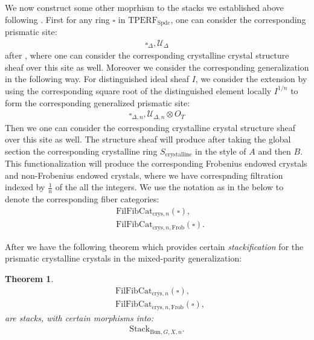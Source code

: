 \documentclass[12pt]{article}
\newtheorem{theorem}{Theorem}
\theoremstyle{definition}
\begin{document}
\noindent We now construct some other moprhism to the stacks we established above following \cite{FS}. First for any ring $\square$ in $\mathrm{TPERF}_{\mathrm{Spd}e}$, one can consider the corresponding prismatic site:
\begin{align}
\square_\Delta,\mathcal{U}_{\Delta}
\end{align} 
after \cite{BS2}, where one can consider the corresponding crystalline crystal structure sheaf over this site as well. Moreover we consider the corresponding generalization in the following way. For distinguished ideal sheaf $I$, we consider the extension by using the corresponding square root of the distinguished element locally ${I}^{1/n}$ to form the corresponding generalized prismatic site:
\begin{align}
\square_{\Delta,n},\mathcal{U}_{\Delta,n}\otimes {O}_T
\end{align} 
Then we one can consider the corresponding crystalline crystal structure sheaf over this site as well. The structure sheaf will produce after taking the global section the corresponding crystalline ring $S_\mathrm{crystalline}$ in the style of $A$ and then $B$. This functionalization will produce the corresponding Frobenius endowed crystals and non-Frobenius endowed crystals, where we have correspnding filtration indexed by $\frac{1}{n}$ of the all the integers. We use the notation as in the below to denote the corresponding fiber categories:
\begin{align}
&\mathrm{FilFibCat}_{\mathrm{crys},n}(\square),\\
&\mathrm{FilFibCat}_{\mathrm{crys},n,\mathrm{Frob}}(\square).
\end{align}

After \cite{FS} we have the following theorem which provides certain \textit{stackification} for the prismatic crystalline crystals in the mixed-parity generalization:

\begin{theorem}
\begin{align}
&\mathrm{FilFibCat}_{\mathrm{crys},n}(\square),\\
&\mathrm{FilFibCat}_{\mathrm{crys},n,\mathrm{Frob}}(\square),
\end{align} 
are stacks, with certain morphisms into:
\begin{align}
\mathrm{Stack}_{\mathrm{Bun},G,X,n}.
\end{align}
\end{theorem}
\end{document}
